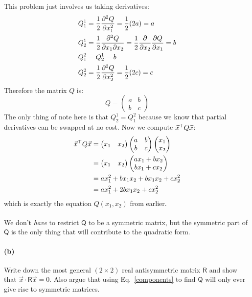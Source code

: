 \documentclass{article}
\begin{document}
\begin{solution}
	This problem just involves us taking derivatives:
	\begin{align*}
		Q^1_1 &= \frac{1}{2}\pdv[2]{Q}{x_1} = \frac{1}{2}(2a) = a\\
		Q^1_2 &= \frac{1}{2}\pdv{Q}{x_1}{x_2} = \frac{1}{2}\pdv{x_2} \pdv{Q}{x_1} = b\\
		Q^2_1 &= Q^1_2 = b\\
		Q^2_2 &= \frac{1}{2}\pdv[2]{Q}{x_2} = \frac{1}{2}(2c) = c
	\end{align*}
	Therefore the matrix $Q$ is:
	\[
		Q = \begin{pmatrix} a & b\\ b& c \end{pmatrix} 
	\] 
	The only thing of note here is that $Q^1_2 = Q^2_1$ because we know that partial derivatives can be 
	swapped at no cost. Now we compute $\vec x^\top Q \vec x$: 
	\begin{align*}
		\vec x^\top Q \vec x &= \begin{pmatrix} x_1 & x_2 \end{pmatrix} \begin{pmatrix} a & b\\
	 b & c\end{pmatrix} \begin{pmatrix} x_1 \\x_2 \end{pmatrix} \\
				&= \begin{pmatrix} x_1 & x_2 \end{pmatrix}\begin{pmatrix} ax_1 + bx_2\\
				bx_1 + cx_2 \end{pmatrix} \\
				&= ax_1^2 + bx_1 x_2 + bx_1x_2 + cx_2^2\\
				&= ax_1^2 + 2bx_1x_2 + cx_2^2 
	\end{align*}
	which is exactly the equation $Q(x_1, x_2)$ from earlier. 
\end{solution}
\phline
\paragraph{}
We don't \emph{have} to restrict $\mathsf{Q}$ to be a symmetric matrix, but the symmetric part of $\mathsf{Q}$ is the only thing that will contribute to the quadratic form.

\paragraph{(b)}
Write down the most general $(2\times 2)$ real antisymmetric matrix $\mathsf{R}$ and show that $\vec{x}\cdot\mathsf{R}\vec{x} = 0$.  Also argue that using
Eq.~\ref{components} to find $\mathsf{Q}$ will only ever give rise to symmetric matrices.
\end{document}
